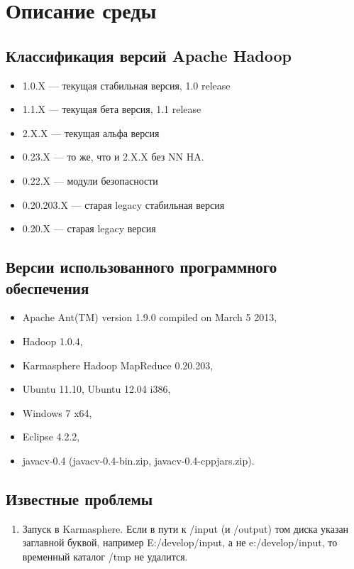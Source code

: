 \documentclass[12pt,a4paper]{extarticle} %
\begin{document}
\newpage\clearpage
\section{Описание среды}

\subsection{Классификация версий Apache Hadoop}
\begin{itemize}
    \item[] 1.0.X ---  текущая стабильная версия, 1.0 release
    \item[] 1.1.X  ---  текущая бета версия, 1.1 release
    \item[] 2.X.X  ---  текущая альфа версия
    \item[] 0.23.X  ---  то же, что и 2.X.X без NN HA.
    \item[] 0.22.X  ---  модули безопасности 
    \item[] 0.20.203.X  ---  старая legacy стабильная версия
    \item[] 0.20.X  ---  старая legacy версия
\end{itemize}


\subsection{Версии использованного программного обеспечения} \label{sec:envsoft}
\begin{itemize}
    \item[] Apache Ant(TM) version 1.9.0 compiled on March 5 2013,
    \item[] Hadoop 1.0.4,
    \item[] Karmasphere Hadoop MapReduce 0.20.203,
    \item[] Ubuntu 11.10, Ubuntu 12.04 i386,
    \item[] Windows 7 x64,
    \item[] Eclipse 4.2.2,
    \item[] javacv-0.4 (javacv-0.4-bin.zip, javacv-0.4-cppjars.zip).
\end{itemize}

\subsection{Известные проблемы}
\begin{enumerate}
    \item Запуск в Karmasphere. Если в пути к /input (и /output) том диска указан заглавной буквой, например E:/develop/input, а не e:/develop/input, то временный каталог /tmp не удалится.
\end{enumerate}
\end{document}

